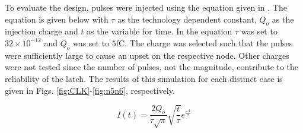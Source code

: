 To evaluate the design, pulses were injected using the equation given in \cite{injeq}. The equation is given below with $\tau$ as the technology dependent constant, $Q_o$ as the injection charge and $t$ as the variable for time. In the equation $\tau$ was set to $32\times10^{-12}$ and $Q_o$ was set to $5\text{fC}$. The charge was selected such that the pulses were sufficiently large to cause an upset on the respective node. Other charges were not tested since the number of pulses, not the magnitude, contribute to the reliability of the latch. The results of this simulation for each distinct case is given in Figs. \ref{fig:CLK}-\ref{fig:n5n6}, respectively. 

\begin{equation}\label{qeq}
	I(t)=\frac{2Q_o}{\tau\sqrt{\pi}}\sqrt{\frac{t}{\tau}}e^{\frac{-t}{\tau}}
\end{equation}

